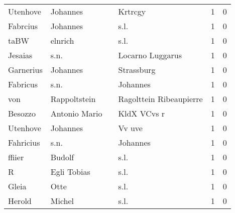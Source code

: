 \begin{tabular}{llllrr}
                 Utenhove &                           Johannes &             &                                     Krtrcgy &          1 &         0 \\
                 Fabrcius &                           Johannes &             &                                        s.l. &          1 &         0 \\
                     taBW &                            elnrich &             &                                        s.l. &          1 &         0 \\
                  Jesaias &                               s.n. &             &                            Locarno Luggarus &          1 &         0 \\
                Garnerius &                           Johannes &             &                                  Strassburg &          1 &         0 \\
                 Fabricus &                               s.n. &             &                                    Johannes &          1 &         0 \\
                      von &                       Rappoltstein &             &                     Ragolttein Ribeaupierre &          1 &         0 \\
                  Besozzo &                      Antonio Mario &             &                                 KldX VCvs r &          1 &         0 \\
                 Utenhove &                           Johannes &             &                                      Vv uve &          1 &         0 \\
                Fahricius &                               s.n. &             &                                    Johannes &          1 &         0 \\
                   ffiier &                             Budolf &             &                                        s.l. &          1 &         0 \\
                        R &                        Egli Tobias &             &                                        s.l. &          1 &         0 \\
                    Gleia &                               Otte &             &                                        s.l. &          1 &         0 \\
                   Herold &                             Michel &             &                                        s.l. &          1 &         0 \\

\end{tabular}
